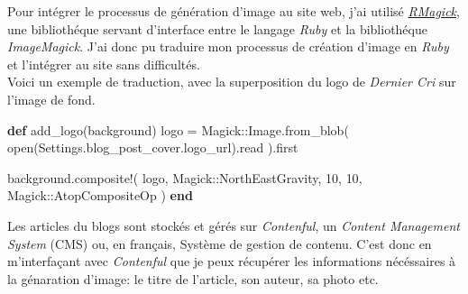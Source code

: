 \documentclass[12pt,a4paper]{article}
\newenvironment{Shaded}{}{}
\newcommand{\KeywordTok}[1]{\textcolor[rgb]{0.00,0.44,0.13}{\textbf{{#1}}}}
\newcommand{\DataTypeTok}[1]{\textcolor[rgb]{0.56,0.13,0.00}{{#1}}}
\newcommand{\DecValTok}[1]{\textcolor[rgb]{0.25,0.63,0.44}{{#1}}}
\newcommand{\CommentTok}[1]{\textcolor[rgb]{0.38,0.63,0.69}{\textit{{#1}}}}
\newcommand{\VariableTok}[1]{\textcolor[rgb]{0.10,0.09,0.49}{{#1}}}
\newcommand{\ExtensionTok}[1]{{#1}}
\newcommand{\NormalTok}[1]{{#1}}
\begin{document}
  \bigskip

  Pour intégrer le processus de génération d'image au site web, j'ai
  utilisé \href{https://github.com/rmagick/rmagick}{\emph{RMagick}}, une
  bibliothéque servant d'interface entre le langage \emph{Ruby} et la
  bibliothéque \emph{ImageMagick}. J'ai donc pu traduire mon processus de
  création d'image en \emph{Ruby} et l'intégrer au site sans
  difficultés.\\
  Voici un exemple de traduction, avec la superposition du logo de
  \emph{Dernier Cri} sur l'image de fond.

  \begin{Shaded}
  \end{Shaded}

  \begin{Shaded}
  \begin{Highlighting}[]
  \KeywordTok{def} \NormalTok{add_logo(background)}
    \NormalTok{logo = }\DataTypeTok{Magick}\NormalTok{::}\DataTypeTok{Image}\NormalTok{.from_blob(}
      \NormalTok{open(}\DataTypeTok{Settings}\NormalTok{.blog_post_cover.logo_url).read}
    \NormalTok{).first}

    \NormalTok{background.composite!(}
      \NormalTok{logo,}
      \DataTypeTok{Magick}\NormalTok{::}\DataTypeTok{NorthEastGravity}\NormalTok{,}
      \DecValTok{10}\NormalTok{,}
      \DecValTok{10}\NormalTok{,}
      \DataTypeTok{Magick}\NormalTok{::}\DataTypeTok{AtopCompositeOp}
    \NormalTok{)}
  \KeywordTok{end}
  \end{Highlighting}
  \end{Shaded}

  \bigskip

  Les articles du blogs sont stockés et gérés sur \emph{Contenful}, un
  \emph{Content Management System} (CMS) ou, en français, Système de
  gestion de contenu. C'est donc en m'interfaçant avec \emph{Contenful}
  que je peux récupérer les informations nécéssaires à la génaration
  d'image: le titre de l'article, son auteur, sa photo etc.

  \bigskip
\end{document}
